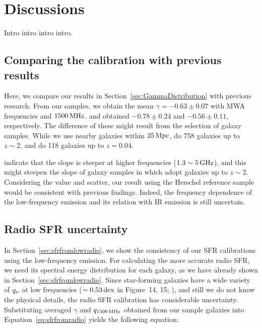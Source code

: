 \chapter{Discussions}\label{chap:discussions}
\begin{chapabstract}

Intro intro intro intro.

\end{chapabstract}

\section{Comparing the calibration with previous results}

Here, we compare our results in Section~\ref{sec:GammaDistribution} with previous research.
From our samples, we obtain the mean $\gamma=-0.63 \pm 0.07$ with MWA frequencies and $1500\,\mathrm{MHz}$.
\citet{CalistroRivera2017a} and \citet{Chyzy2018} obtained $-0.78 \pm 0.24$ and $-0.56 \pm 0.11$, respectively.
The difference of these might result from the selection of galaxy samples.
While we use nearby galaxies within $25\,\mathrm{Mpc}$, \citet{CalistroRivera2017a} do 758 galaxies up to $z\sim2$, and \citet{Chyzy2018} do 118 galaxies up to $z=0.04$.

\citet{Chyzy2018} indicate that the slope is steeper at higher frequencies ($1.3 \sim 5\,\mathrm{GHz}$), and this might steepen the slope of galaxy samples in \citet{CalistroRivera2017a} which adopt galaxies up to $z\sim2$.
Considering the value and scatter, our result using the Herschel reference sample would be consistent with previous findings.
Indeed, the frequency dependence of the low-frequency emission and its relation with IR emission is still uncertain.



\section{Radio SFR uncertainty}

In Section~\ref{sec:sfrfromlowradio}, we show the consistency of our SFR calibrations using the low-frequency emission.
For calculating the more accurate radio SFR, we need its spectral energy distribution for each galaxy, as we have already shown in Section~\ref{sec:sfrfromlowradio}.
Since star-forming galaxies have a wide variety of $q_{\nu}$ at low frequencies ($\sim 0.53\,\mathrm{dex}$ in Figure~14, 15; \citealt{CalistroRivera2017a}), and still we do not know the physical details, the radio SFR calibration has considerable uncertainty.
Substituting averaged $\gamma$ and $q_{\mathrm{1500\,\mathrm{MHz}}}$ obtained from our sample galaxies into Equation~\ref{eq:sfrfromradio} yields the following equation:

